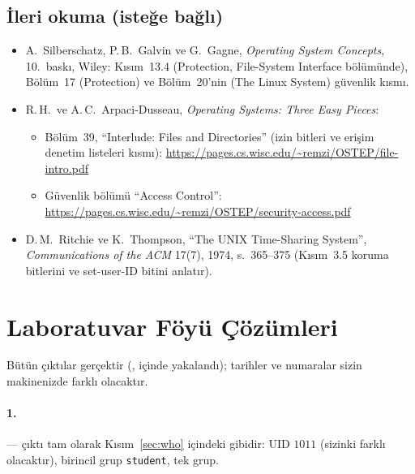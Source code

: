 \subsection*{İleri okuma (isteğe bağlı)}
\begin{itemize}
  \item A.\ Silberschatz, P.\,B.\ Galvin ve G.\ Gagne, \emph{Operating System Concepts}, 10.\ baskı, Wiley: Kısım~13.4 (Protection, File-System Interface bölümünde), Bölüm~17 (Protection) ve Bölüm~20'nin (The Linux System) güvenlik kısmı.
  \item R.\,H.\ ve A.\,C.\ Arpaci-Dusseau, \emph{Operating Systems: Three Easy Pieces}:
  \begin{itemize}
    \item Bölüm~39, ``Interlude: Files and Directories'' (izin bitleri ve erişim denetim listeleri kısmı): \url{https://pages.cs.wisc.edu/~remzi/OSTEP/file-intro.pdf}
    \item Güvenlik bölümü ``Access Control'': \url{https://pages.cs.wisc.edu/~remzi/OSTEP/security-access.pdf}
  \end{itemize}
  \item D.\,M.\ Ritchie ve K.\ Thompson, ``The UNIX Time-Sharing System'', \emph{Communications of the ACM} 17(7), 1974, s.~365--375 (Kısım~3.5 koruma bitlerini ve set-user-ID bitini anlatır).
\end{itemize}

\section{Laboratuvar Föyü Çözümleri}
\label{sec:sol}

Bütün çıktılar gerçektir (,  içinde yakalandı); tarihler ve numaralar sizin makinenizde farklı olacaktır.

\paragraph{1.}  --- çıktı tam olarak Kısım~\ref{sec:who} içindeki gibidir: UID $1011$ (sizinki farklı olacaktır), birincil grup \texttt{student}, tek grup.

